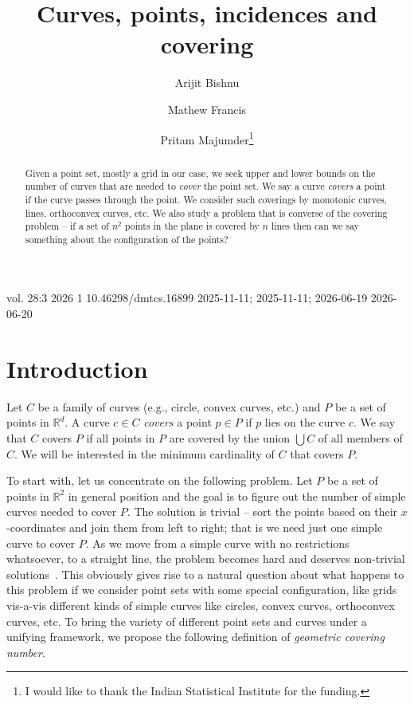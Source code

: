 \documentclass[
final
]{dmtcs-episciences}
\author[Arijit Bishnu et al.]{Arijit Bishnu\affiliationmark{1}
  \and Mathew Francis\affiliationmark{2}
  \and Pritam Majumder\affiliationmark{1}\thanks{I would like to thank the Indian Statistical Institute for the funding.}}
\title{Curves, points, incidences and covering}
\affiliation{
  Indian Statistical Institute, Kolkata, India\\
  Indian Statistical Institute, Chennai, India}
\numberwithin{equation}{subsection}
\newcommand{\R}{\mathbb{R}}
\newcommand{\remove}[1]{}
\begin{document}
\publicationdata
{vol. 28:3}
{2026}
{1}
{10.46298/dmtcs.16899}
{2025-11-11; 2025-11-11; 2026-06-19}
{2026-06-20}
\maketitle
\begin{abstract}
	\remove{Motivated by the concept of arboricity or linear arboricity in an undirected graph that seeks to find   structures, like non-crossing trees or paths, that covers edges of the graph, we pose certain problems related to points and curves in geometry.} Given a point set, mostly a grid in our case, we seek upper and lower bounds on the number of curves that are needed to \emph{cover} the point set. We say a curve \emph{covers} a point if the curve passes through the point. We consider such coverings by {monotonic curves, lines, orthoconvex curves, etc.} We also study a problem that is converse of the covering problem -- if a set of $n^2$ points in the plane is covered by $n$ lines then can we say something about the configuration of the points?
\end{abstract}

\section{Introduction}
\label{sec:intro}
\noindent
Let $C$ be a family of curves (e.g., circle, convex curves, etc.) and $P$ be a set of points in $\R^d$. A curve $c \in C$ \emph{covers} a point $p \in P$ if $p$ lies on the curve $c$. We say that $C$ covers $P$ if all points in $P$ are covered by the union $\bigcup C$ of all members of $C$. We will be interested in the minimum cardinality of $C$ that covers $P$. 

\medskip

To start with, let us concentrate on the following problem. Let $P$ be a set of points in $\mathbb{R}^2$ in general position and the goal is to figure out the number of simple curves needed to cover $P$. The solution is trivial -- sort the points based on their $x$-coordinates and join them from left to right; that is we need just one simple curve to cover $P$. As we move from a simple curve with no restrictions whatsoever, to a straight line, the problem becomes hard and deserves non-trivial solutions~\cite{KratschPR16,BoissonnatDGK18,AfshaniBDN16,LangermanM05}. This obviously gives rise to a natural question about what happens to this problem if we consider point sets with some special configuration, like grids vis-a-vis different kinds of simple curves like circles, convex curves, orthoconvex curves, etc. To bring the variety of different point sets and curves under a unifying framework, we propose the following definition of \emph{geometric covering number}. 
\end{document}
